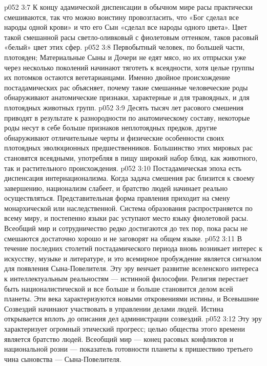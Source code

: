 \vs p052 3:7 К концу адамической диспенсации в обычном мире расы практически смешиваются, так что можно воистину провозгласить, что «Бог сделал все народы одной крови» и что его Сын «сделал все народы одного цвета». Цвет такой смешанной расы светло\hyp{}оливковый с фиолетовым оттенком, таков расовый «белый» цвет этих сфер.
\vs p052 3:8 \pc Первобытный человек, по большей части, плотояден; Материальные Сыны и Дочери не едят мясо, но их отпрыски уже через несколько поколений начинают тяготеть к всеядности, хотя целые группы их потомков остаются вегетарианцами. Именно двойное происхождение постадамических рас объясняет, почему такие смешанные человеческие роды обнаруживают анатомические признаки, характерные и для травоядных, и для плотоядных животных групп.
\vs p052 3:9 Десять тысяч лет расового смешения приводят в результате к разнородности по анатомическому составу, некоторые роды несут в себе больше признаков неплотоядных предков, другие обнаруживают отличительные черты и физические особенности своих плотоядных эволюционных предшественников. Большинство этих мировых рас становятся всеядными, употребляя в пищу широкий набор блюд, как животного, так и растительного происхождения.
\vs p052 3:10 \pc Постадамическая эпоха есть диспенсация интернационализма. Когда задача смешения рас близится к своему завершению, национализм слабеет, и братство людей начинает реально осуществляться. Представительная форма правления приходит на смену монархической или наследственной. Система образования распространяется по всему миру, и постепенно языки рас уступают место языку фиолетовой расы. Всеобщий мир и сотрудничество редко достигаются до тех пор, пока расы не смешаются достаточно хорошо и не заговорят на общем языке.
\vs p052 3:11 В течение последних столетий постадамического периода вновь возникает интерес к искусству, музыке и литературе, и это всемирное пробуждение является сигналом для появления Сына\hyp{}Повелителя. Эту эру венчает развитие вселенского интереса к интеллектуальным реальностям --- истинной философии. Религия перестает быть националистической и все больше и больше становится делом всей планеты. Эти века характеризуются новыми откровениями истины, и Всевышние Созвездий начинают участвовать в управлении делами людей. Истина открывается вплоть до описания дел администрации созвездий.
\vs p052 3:12 Эту эру характеризует огромный этический прогресс; целью общества этого времени является братство людей. Всеобщий мир --- конец расовых конфликтов и национальной розни --- показатель готовности планеты к пришествию третьего чина сыновства --- Сына\hyp{}Повелителя.
